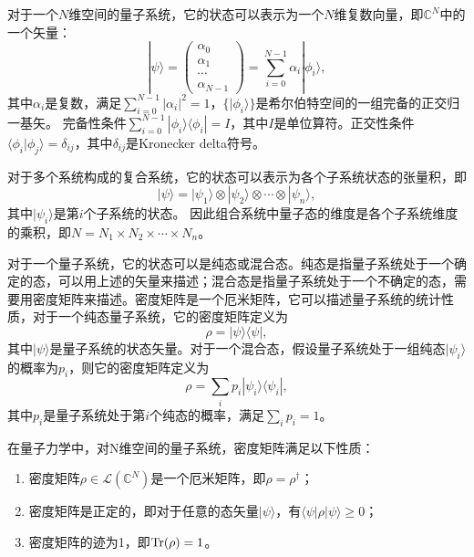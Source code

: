 对于一个$N$维空间的量子系统，它的状态可以表示为一个$N$维复数向量，即$\mathbb{C}^N$中的一个矢量：
\begin{equation}
    |\psi\rangle = \begin{pmatrix} \alpha_0 \\ \alpha_1 \\ \cdots \\ \alpha_{N-1} \end{pmatrix} = \sum_{i=0}^{N-1} \alpha_i|\phi_i\rangle,
\end{equation}
其中$\alpha_i$是复数，满足$\sum_{i=0}^{N-1} |\alpha_i|^2 = 1$，$\{|\phi_i\rangle\}$是希尔伯特空间的一组完备的正交归一基矢。
完备性条件$\sum_{i=0}^{N-1} |\phi_i\rangle\langle\phi_i| = I$，其中$I$是单位算符。正交性条件$\langle\phi_i|\phi_j\rangle = \delta_{ij}$，其中$\delta_{ij}$是Kronecker delta符号。


对于多个系统构成的复合系统，它的状态可以表示为各个子系统状态的张量积，即
\begin{equation}
    |\psi\rangle = |\psi_1\rangle \otimes |\psi_2\rangle \otimes \cdots \otimes |\psi_n\rangle,
\end{equation}
其中$|\psi_i\rangle$是第$i$个子系统的状态。
因此组合系统中量子态的维度是各个子系统维度的乘积，即$N = N_1 \times N_2 \times \cdots \times N_n$。

对于一个量子系统，它的状态可以是纯态或混合态。纯态是指量子系统处于一个确定的态，可以用上述的矢量来描述；混合态是指量子系统处于一个不确定的态，需要用密度矩阵来描述。密度矩阵是一个厄米矩阵，它可以描述量子系统的统计性质，对于一个纯态量子系统，它的密度矩阵定义为
\begin{equation}
    \rho = |\psi\rangle\langle\psi|,
\end{equation}
其中$|\psi\rangle$是量子系统的状态矢量。对于一个混合态，假设量子系统处于一组纯态$|\psi_i\rangle$的概率为$p_i$，则它的密度矩阵定义为
\begin{equation}
    \rho = \sum_i p_i |\psi_i\rangle\langle\psi_i|,
\end{equation}
其中$p_i$是量子系统处于第$i$个纯态的概率，满足$\sum_i p_i = 1$。


在量子力学中，对N维空间的量子系统，密度矩阵满足以下性质：
\begin{enumerate}
    \item 密度矩阵$\rho\in \mathcal{L}(\mathbb{C}^N)$是一个厄米矩阵，即$\rho = \rho^\dagger$；
    \item 密度矩阵是正定的，即对于任意的态矢量$|\psi\rangle$，有$\langle\psi|\rho|\psi\rangle \geq 0$；
    \item 密度矩阵的迹为1，即$\Tr(\rho) = 1$。
\end{enumerate}

